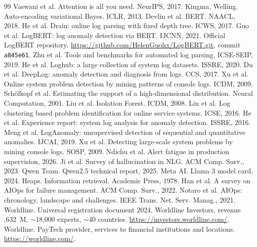 \documentclass[12pt,a4paper]{report}
\begin{document}
\begin{thebibliography}{99}
 Vaswani et al. Attention is all you need. NeurIPS, 2017.
 Kingma, Welling. Auto-encoding variational Bayes. ICLR, 2013.
 Devlin et al. BERT. NAACL, 2018.
 He et al. Drain: online log parsing with fixed depth tree. ICWS, 2017.
 Guo et al. LogBERT: log anomaly detection via BERT. IJCNN, 2021.
 Official LogBERT repository. \url{https://github.com/HelenGuohx/LogBERT.git}, commit \texttt{a845e61}.
 Zhu et al. Tools and benchmarks for automated log parsing. ICSE-SEIP, 2019.
 He et al. Loghub: a large collection of system log datasets. ISSRE, 2020.
 Du et al. DeepLog: anomaly detection and diagnosis from logs. CCS, 2017.
 Xu et al. Online system problem detection by mining patterns of console logs. ICDM, 2009.
 Sch\"olkopf et al. Estimating the support of a high-dimensional distribution. Neural Computation, 2001.
 Liu et al. Isolation Forest. ICDM, 2008.
 Lin et al. Log clustering based problem identification for online service systems. ICSE, 2016.
 He et al. Experience report: system log analysis for anomaly detection. ISSRE, 2016.
 Meng et al. LogAnomaly: unsupervised detection of sequential and quantitative anomalies. IJCAI, 2019.
 Xu et al. Detecting large-scale system problems by mining console logs. SOSP, 2009.
 Ndichu et al. Alert fatigue in production supervision, 2026.
 Ji et al. Survey of hallucination in NLG. ACM Comp. Surv., 2023.
 Qwen Team. Qwen2.5 technical report, 2025.
 Meta AI. Llama 3 model card, 2024.
 Heaps. Information retrieval. Academic Press, 1978.
 Han et al. A survey on AIOps for failure management. ACM Comp. Surv., 2022.
 Notaro et al. AIOps: chronology, landscape and challenges. IEEE Trans. Net. Serv. Manag., 2021.
 Worldline. Universal registration document 2024. Worldline Investors, revenue ,632~M, $\sim$18,000 experts, $\sim$40 countries. \url{https://investors.worldline.com/}.
 Worldline. PayTech provider, services to financial institutions and locations. \url{https://worldline.com/}.
\end{thebibliography}
\end{document}
